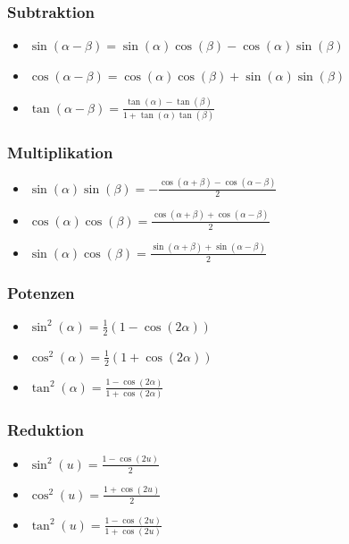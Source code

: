 \documentclass[7pt,landscape, margin = 0.1mm]{article}
\begin{document}
\begin{multicols}{4}
\begin{flushleft}
\subsubsection{Subtraktion}
\begin{itemize}
 \item $\sin(\alpha - \beta) = \sin(\alpha) \cos(\beta) - \cos(\alpha)\sin(\beta)$
 \item $\cos(\alpha - \beta) = \cos(\alpha) \cos(\beta) + \sin(\alpha)\sin(\beta)$
 \item $\tan(\alpha - \beta) = \frac{\tan(\alpha) - \tan(\beta)}{1+\tan(\alpha) \tan(\beta)}$
\end{itemize}

\subsubsection{Multiplikation}
\begin{itemize}
 \item $\sin(\alpha) \sin(\beta) = -\frac{\cos(\alpha + \beta) - \cos(\alpha - \beta)}{2}$
 \item $\cos(\alpha) \cos(\beta) =  \frac{\cos(\alpha + \beta) + \cos(\alpha - \beta)}{2}$
 \item $\sin(\alpha) \cos(\beta) =  \frac{\sin(\alpha + \beta) + \sin(\alpha - \beta)}{2}$
\end{itemize}

\subsubsection{Potenzen}
\begin{itemize}
 \item $\sin^2(\alpha) = \frac{1}{2}(1-\cos(2\alpha))$
 \item $\cos^2(\alpha) = \frac{1}{2}(1+\cos(2\alpha))$
 \item $\tan^2(\alpha) = \frac{1-\cos(2\alpha)}{1+\cos(2\alpha)}$
\end{itemize}

\subsubsection{Reduktion}
\begin{itemize}
\item $\sin^2(u) = \frac{1-\cos(2u)}{2}$
\item $\cos^2(u) = \frac{1+\cos(2u)}{2}$
\item $\tan^2(u) = \frac{1-\cos(2u)}{1+\cos(2u)}$


\end{itemize}
\end{flushleft}
\end{multicols}
\end{document}
